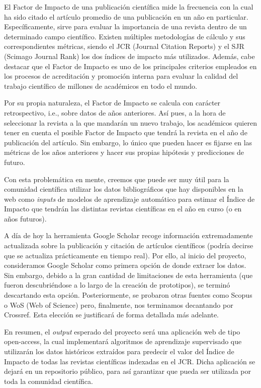 
El Factor de Impacto de una publicación científica mide la frecuencia con la cual ha sido citado el artículo promedio de una publicación en un año en particular. Específicamente, sirve para evaluar la importancia de una revista dentro de un determinado campo científico. Existen múltiples metodologías de cálculo y sus correspondientes métricas, siendo el JCR (Journal Citation Reports) y el SJR (Scimago Journal Rank) los dos índices de impacto más utilizados.
Además, cabe destacar que el Factor de Impacto es uno de los principales criterios empleados en los procesos de acreditación y promoción interna para evaluar la calidad del trabajo científico de millones de académicos en todo el mundo.

Por su propia naturaleza, el Factor de Impacto se calcula con carácter retrospectivo, i.e., sobre datos de años anteriores. Así pues, a la hora de seleccionar la revista a la que mandarán un nuevo trabajo, los académicos quieren tener en cuenta el posible Factor de Impacto que tendrá la revista en el año de publicación del artículo. Sin embargo, lo único que pueden hacer es fijarse en las métricas de los años anteriores y hacer sus propias hipótesis y predicciones de futuro.

Con esta problemática en mente, creemos que puede ser muy útil para la comunidad científica utilizar los datos bibliográficos que hay disponibles en la web como \textit{inputs} de modelos de aprendizaje automático para estimar el Índice de Impacto que tendrán las distintas revistas científicas en el año en curso (o en años futuros).

A día de hoy la herramienta Google Scholar recoge información extremadamente actualizada sobre la publicación y citación de artículos científicos (podría decirse que se actualiza prácticamente en tiempo real). Por ello, al inicio del proyecto, consideramos Google Scholar como primera opción de donde extraer los datos. Sin embargo, debido a la gran cantidad de limitaciones de esta herramienta (que fueron descubriéndose a lo largo de la creación de prototipos), se terminó descartando esta opción. Posteriormente, se probaron otras fuentes como Scopus o WoS (Web of Science) pero, finalmente, nos terminamos decantando por Crossref. Esta elección se justificará de forma detallada más adelante.

En resumen, el \textit{output} esperado del proyecto será una aplicación web de tipo open-access, la cual implementará algoritmos de aprendizaje supervisado que utilizarán los datos históricos extraídos para predecir el valor del Índice de Impacto de todas las revistas científicas indexadas en el JCR. Dicha aplicación se dejará en un repositorio público, para así garantizar que pueda ser utilizada por toda la comunidad científica. 
